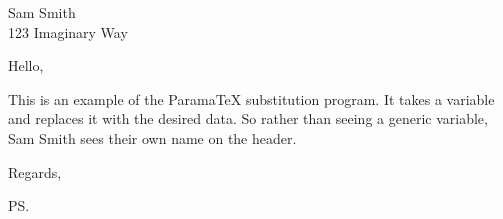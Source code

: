\documentclass[a4paper,12pt]{letter}
\begin{document}
\begin{letter}{{Sam Smith}\\{123 Imaginary Way}}

\opening{Hello,} %
This is an example of the ParamaTeX substitution program. It takes a variable and replaces it with the desired data. So rather than seeing a generic variable, {Sam Smith} sees their own name on the header. 


\closing{Regards,} %

\cc{} %
\encl{} %
\ps{} %

\end{letter}
\end{document}
